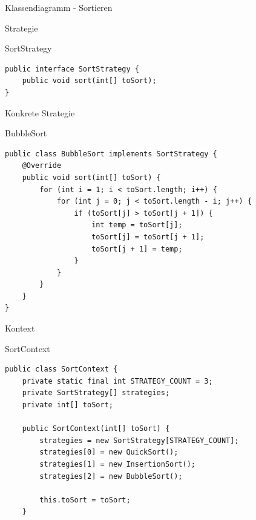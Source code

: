 \begin{frame}{Klassendiagramm - Sortieren}
\end{frame}

\begin{frame}[fragile]{Strategie}
	\begin{exampleblock}{SortStrategy}
\begin{lstlisting}
public interface SortStrategy {
	public void sort(int[] toSort);
}
\end{lstlisting}
 	\end{exampleblock}
\end{frame}

\begin{frame}[fragile]{Konkrete Strategie}
	\begin{exampleblock}{BubbleSort}
 		\begin{lstlisting}
public class BubbleSort implements SortStrategy {
	@Override
	public void sort(int[] toSort) {
		for (int i = 1; i < toSort.length; i++) {
			for (int j = 0; j < toSort.length - i; j++) {
				if (toSort[j] > toSort[j + 1]) {
					int temp = toSort[j];
					toSort[j] = toSort[j + 1];
					toSort[j + 1] = temp;
				}
			}
		}
	}
}
 		\end{lstlisting}
 	\end{exampleblock}
\end{frame}

\begin{frame}[fragile]{Kontext}
	\begin{exampleblock}{SortContext}
 		\begin{lstlisting}
public class SortContext {
	private static final int STRATEGY_COUNT = 3;
	private SortStrategy[] strategies;
	private int[] toSort;
	
	public SortContext(int[] toSort) {
		strategies = new SortStrategy[STRATEGY_COUNT];
		strategies[0] = new QuickSort();
		strategies[1] = new InsertionSort();
		strategies[2] = new BubbleSort();
		
		this.toSort = toSort;
	}
 		\end{lstlisting}
 	\end{exampleblock}
\end{frame}

